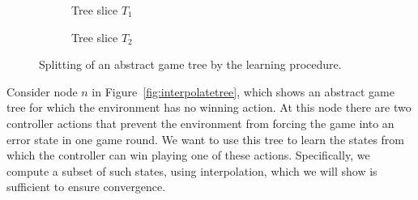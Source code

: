 \begin{figure}[t]
    \begin{subfigure}[t]{.5\textwidth}
        \centering
        \caption{Tree slice $T_1$}
        \label{fig:treef1}
    \end{subfigure}%
    \begin{subfigure}[t]{.5\textwidth}
        \centering
        \caption{Tree slice $T_2$}
        \label{fig:treef2}
    \end{subfigure}
    \caption{Splitting of an abstract game tree by the learning procedure.}
    \label{fig:interpolanttrees}
\end{figure}




Consider node $n$ in Figure~\ref{fig:interpolatetree}, which shows an abstract game tree for which the environment has no winning action. At this node there are two controller actions that prevent the environment from forcing the game into an error state in one game round. We want to use this tree to learn the states from which the controller can win playing one of these actions. Specifically, we compute a subset of such states, using interpolation, which we will show is sufficient to ensure convergence.

